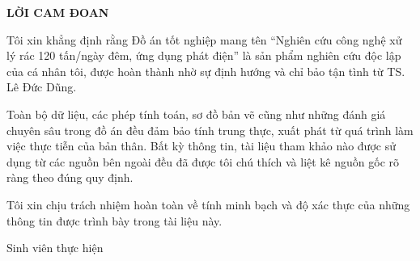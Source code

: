 \documentclass[../main.tex]{subfiles}
\begin{document}
\begin{center}
    \Large{\textbf{LỜI CAM ĐOAN}}\\
\end{center}
\vspace{1cm}

Tôi xin khẳng định rằng Đồ án tốt nghiệp mang tên “Nghiên cứu công nghệ xử lý rác 120 tấn/ngày đêm, ứng dụng phát điện” là sản phẩm nghiên cứu độc lập của cá nhân tôi, được hoàn thành nhờ sự định hướng và chỉ bảo tận tình từ TS. Lê Đức Dũng.

Toàn bộ dữ liệu, các phép tính toán, sơ đồ bản vẽ cũng như những đánh giá chuyên sâu trong đồ án đều đảm bảo tính trung thực, xuất phát từ quá trình làm việc thực tiễn của bản thân. Bất kỳ thông tin, tài liệu tham khảo nào được sử dụng từ các nguồn bên ngoài đều đã được tôi chú thích và liệt kê nguồn gốc rõ ràng theo đúng quy định.

Tôi xin chịu trách nhiệm hoàn toàn về tính minh bạch và độ xác thực của những thông tin được trình bày trong tài liệu này.

\begin{flushright}
Sinh viên thực hiện\\
\end{flushright}
\end{document}
